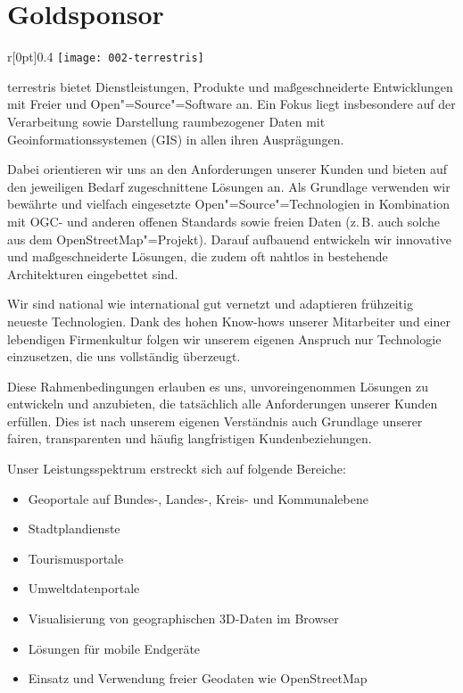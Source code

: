 \section*{Goldsponsor}
\begin{wrapfigure}[0]{r}[0pt]{0.4\textwidth}
  \centering\vspace{-6\baselineskip}
  \texttt{[image: 002-terrestris]}
\end{wrapfigure}
terrestris bietet Dienstleistungen, Produkte und maßgeschneiderte Entwicklungen mit Freier und
Open"=Source"=Software an. Ein Fokus liegt insbesondere auf der Verarbeitung sowie Darstellung
raumbezogener Daten mit Geoinformationssystemen (GIS) in allen ihren Ausprägungen.

Dabei orientieren wir uns an den Anforderungen unserer Kunden und bieten auf den jeweiligen Bedarf
zugeschnittene Lösungen an. Als Grundlage verwenden wir bewährte und vielfach eingesetzte
Open"=Source"=Technologien in Kombination mit OGC- und anderen offenen Standards sowie freien Daten
(z.\,B.
auch solche aus dem OpenStreetMap"=Projekt). Darauf aufbauend entwi\-ckeln wir innovative und
maßgeschneiderte Lösungen, die zudem oft nahtlos in bestehende Architekturen eingebettet sind.

Wir sind national wie international gut vernetzt und adaptieren frühzeitig neueste Technologien.
Dank des hohen Know-hows unserer Mitarbeiter und einer lebendigen Firmenkultur folgen wir unserem
eigenen Anspruch nur Technologie einzusetzen, die uns vollständig überzeugt. 

Diese Rahmenbedingungen erlauben es uns, unvoreingenommen Lösungen
zu entwickeln und anzubieten, die tatsächlich alle Anforderungen unserer
Kunden erfüllen. Dies ist nach unserem eigenen Verständnis auch
Grundlage unserer fairen, transparenten und häufig langfristigen Kundenbeziehungen.

Unser Leistungsspektrum erstreckt sich auf folgende Bereiche:
\vspace{-0.2\baselineskip}
\begin{itemize}
  \RaggedRight
  \setlength{\itemsep}{-0.2\baselineskip}
  \item Geoportale auf Bundes-, Landes-, Kreis- und Kommunalebene
  \item Stadtplandienste
  \item Tourismusportale
  \item Umweltdatenportale
  \item Visualisierung von geographischen 3D-Daten im Browser
  \item Lösungen für mobile Endgeräte
  \item Einsatz und Verwendung freier Geodaten wie OpenStreetMap
\end{itemize}
\vspace{-0.3\baselineskip}
\justifying

